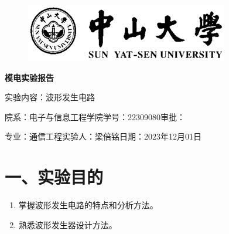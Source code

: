\documentclass[a4paper,10pt,notitlepage]{article}
\begin{document}
	\large
	\onehalfspacing
	\begin{figure}[h]
		\raggedright
		\includegraphics{预习报告/1.png}
	\end{figure}
	\centering
	{\Huge\textbf{模电实验报告}\par}
	\vspace{0.2cm}
	{\huge{实验内容：波形发生电路}\par}
	\raggedright
	\vspace{0.3cm}
	\begin{centering}
		{\large 院系：电子与信息工程学院\hfill 学号：22309080\hfill 审批：\hspace{2cm} \par
			专业：通信工程\hfill 实验人：梁倍铭\hfill 日期：2023年12月01日 \par}
	\end{centering}
	\vspace{0.3cm}
	\section*{一、实验目的}
	\begin{enumerate}
		\item 掌握波形发生电路的特点和分析方法。
		\item 熟悉波形发生器设计方法。
	\end{enumerate}
\end{document}
